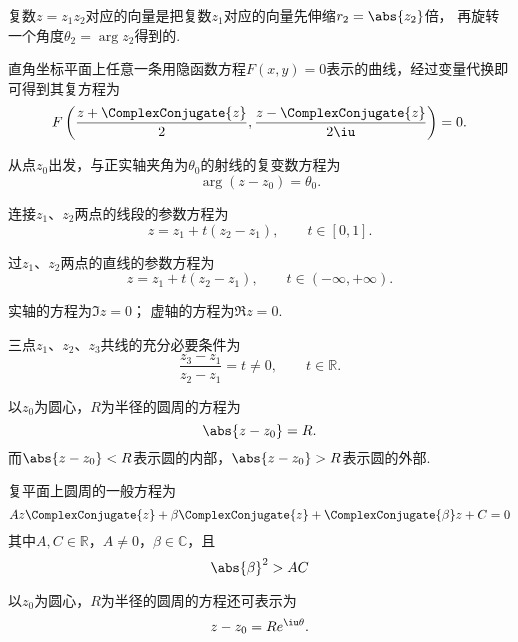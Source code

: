 复数\(z=z_1 z_2\)对应的向量是把复数\(z_1\)对应的向量先伸缩\(r_2 = \abs{z_2}\)倍，
再旋转一个角度\(\theta_2 = \arg z_2\)得到的.

直角坐标平面上任意一条用隐函数方程\(F(x,y)=0\)表示的曲线，经过变量代换即可得到其复方程为\begin{equation*}
F\left(\frac{z+\ComplexConjugate{z}}{2},\frac{z-\ComplexConjugate{z}}{2\iu}\right)=0.
\end{equation*}

\begin{example}%
从点\(z_0\)出发，与正实轴夹角为\(\theta_0\)的射线的复变数方程为\begin{equation*}
\arg(z-z_0) = \theta_0.
\end{equation*}
\end{example}

\begin{example}%
连接\(z_1\)、\(z_2\)两点的线段的参数方程为\begin{equation*}
z = z_1 + t(z_2 - z_1), \qquad t \in [0,1].
\end{equation*}
\end{example}

\begin{example}%
过\(z_1\)、\(z_2\)两点的直线的参数方程为\begin{equation*}
z = z_1 + t(z_2 - z_1), \qquad t \in (-\infty,+\infty).
\end{equation*}

实轴的方程为\(\Im z = 0\)；
虚轴的方程为\(\Re z = 0\).
\end{example}

\begin{example}%
三点\(z_1\)、\(z_2\)、\(z_3\)共线的充分必要条件为\begin{equation*}
\frac{z_3 - z_1}{z_2 - z_1} = t \neq 0, \qquad t \in \mathbb{R}.
\end{equation*}
\end{example}

\begin{example}%
以\(z_0\)为圆心，\(R\)为半径的圆周的方程为\begin{equation*}
\abs{z - z_0} = R.
\end{equation*}而\(\abs{z-z_0}<R\)表示圆的内部，\(\abs{z-z_0}>R\)表示圆的外部.

复平面上圆周的一般方程为\begin{equation*}
A z \ComplexConjugate{z} + \beta \ComplexConjugate{z} + \ComplexConjugate{\beta} z + C = 0
\end{equation*}其中\(A,C\in\mathbb{R}\)，\(A \neq 0\)，\(\beta\in\mathbb{C}\)，且\begin{equation*}
\abs{\beta}^2 > AC
\end{equation*}

以\(z_0\)为圆心，\(R\)为半径的圆周的方程还可表示为\begin{equation*}
z - z_0 = R e^{\iu \theta}.
\end{equation*}
\end{example}

